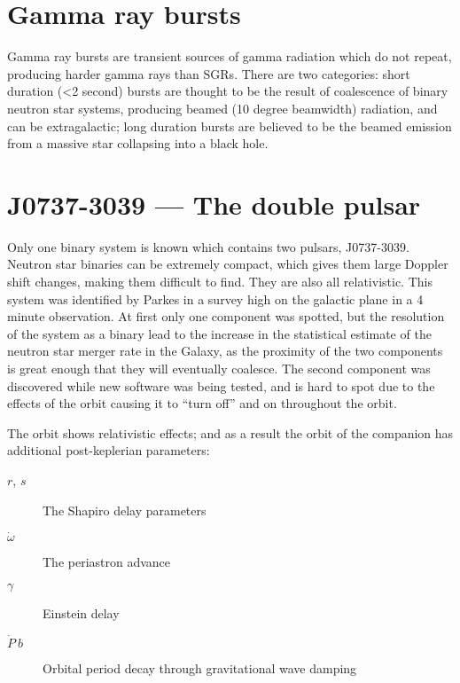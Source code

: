 \section{Gamma ray bursts}
\label{sec:gamma-ray-bursts}

Gamma ray bursts are transient sources of gamma radiation which do not
repeat, producing harder gamma rays than SGRs. There are two
categories: short duration (<2 second) bursts are thought to be the
result of coalescence of binary neutron star systems, producing beamed
(10 degree beamwidth) radiation, and can be extragalactic; long
duration bursts are believed to be the beamed emission from a massive
star collapsing into a black hole.

\section{J0737-3039 --- The double pulsar}
\label{sec:j0737-3039-double}

Only one binary system is known which contains two pulsars,
J0737-3039. Neutron star binaries can be extremely compact, which
gives them large Doppler shift changes, making them difficult to
find. They are also all relativistic. This system was identified by
Parkes in a survey high on the galactic plane in a 4 minute
observation. At first only one component was spotted, but the
resolution of the system as a binary lead to the increase in the
statistical estimate of the neutron star merger rate in the Galaxy, as
the proximity of the two components is great enough that they will
eventually coalesce. The second component was discovered while new
software was being tested, and is hard to spot due to the effects of
the orbit causing it to ``turn off'' and on throughout the orbit.

The orbit shows relativistic effects; and as a result the orbit of the
companion has additional post-keplerian parameters:
\begin{description}
\item[$r$, $s$] The Shapiro delay parameters
\item[$\dot{\omega}$] The periastron advance
\item[$\gamma$] Einstein delay
\item[$\dot{P}~b$] Orbital period decay through gravitational wave damping
\end{description}

